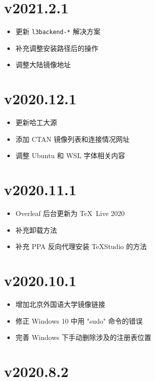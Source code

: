 \section*{v2021.2.1}

\begin{itemize}
  \item 更新 \texttt{l3backend-*} 解决方案
  \item 补充调整安装路径后的操作
  \item 调整大陆镜像地址
\end{itemize}
\section*{v2020.12.1}

\begin{itemize}
  \item 更新哈工大源
  \item 添加 CTAN 镜像列表和连接情况网址
  \item 调整 Ubuntu 和 WSL 字体相关内容
\end{itemize}

\section*{v2020.11.1}

\begin{itemize}
  \item Overleaf 后台更新为 \TeX~Live 2020
  \item 补充卸载方法
  \item 补充 PPA 反向代理安装 \TeX Studio 的方法
\end{itemize}

\section*{v2020.10.1}

\begin{itemize}
  \item 增加北京外国语大学镜像链接
  \item 修正 Windows 10 中用 "sudo" 命令的错误
  \item 完善 Windows 下手动删除涉及的注册表位置
\end{itemize}

\section*{v2020.8.2}

